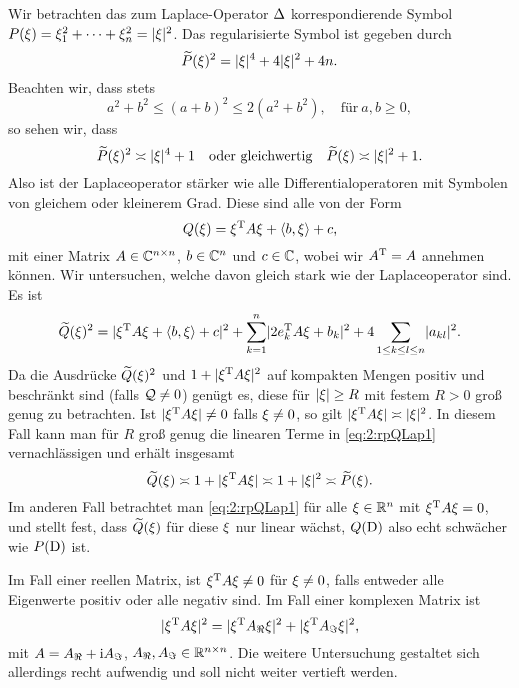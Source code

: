 \begin{exa}\label{exa:2:lap}
Wir betrachten das zum Laplace-Operator $\Delta$
korrespondierende Symbol $P(\xi)=\xi_1^2+\dots+\xi_n^2=\lvert\xi\rvert^2$.
Das regularisierte Symbol ist gegeben durch
\begin{equation}
\widetilde{P}(\xi)^2=\lvert\xi\rvert^4+4\lvert\xi\rvert^2+4n.
\end{equation}
Beachten wir, dass stets
\begin{equation}\label{eq:2:sqrest}
a^2+b^2\leq(a+b)^2\leq2(a^2+b^2),\quad\text{für}~a,b\geq0,
\end{equation}
so sehen wir, dass
\begin{equation}
\widetilde{P}(\xi)^2\asymp\lvert\xi\rvert^4+1\quad\text{oder gleichwertig}\quad\widetilde{P}(\xi)\asymp\lvert\xi\rvert^2+1.
\end{equation}
Also ist der Laplaceoperator stärker wie alle Differentialoperatoren
mit Symbolen von gleichem oder kleinerem Grad.
Diese sind alle von der Form
\begin{equation}
Q(\xi)=\xi^{\mathrm{T}} A\xi+\langle b,\xi\rangle+c,
\end{equation}
mit einer Matrix $A\in\mathbb C^{n\times n}$, $b\in\mathbb C^n$ und $c\in\mathbb C$,
wobei wir $A^{\mathrm{T}}=A$ annehmen können.
Wir untersuchen, welche davon gleich stark wie der Laplaceoperator sind.
Es ist
\begin{equation}\label{eq:2:rpQLap1}
\widetilde{Q}(\xi)^2=\lvert\xi^{\mathrm{T}} A\xi+\langle b,\xi\rangle+c\rvert^2+\sum_{k=1}^n\lvert2e^{\mathrm{T}}_kA\xi+b_k\rvert^2
+4\sum_{1\leq k\leq l\leq n}\lvert a_{kl}\rvert^2.
\end{equation}
Da die Ausdrücke $\widetilde{Q}(\xi)^2$ und $1+\lvert\xi^{\mathrm{T}} A\xi\rvert^2$
auf kompakten Mengen positiv und beschränkt sind (falls $\mathcal Q\neq0$) genügt es,
diese für $\lvert\xi\rvert\geq R$ mit festem $R>0$ groß genug zu betrachten.
Ist $\lvert\xi^{\mathrm{T}} A\xi\rvert\neq0$ falls $\xi\neq0$,
so gilt $\lvert\xi^{\mathrm{T}} A\xi\rvert\asymp\lvert\xi\rvert^2$.
In diesem Fall kann man für $R$ groß genug die
linearen Terme in \eqref{eq:2:rpQLap1} vernachlässigen
und erhält insgesamt
\begin{equation}
\widetilde{Q}(\xi)\asymp1+\lvert\xi^{\mathrm{T}} A\xi\rvert\asymp1+\lvert\xi\rvert^2\asymp\widetilde{P}(\xi).
\end{equation}
Im anderen Fall betrachtet man \eqref{eq:2:rpQLap1}
für alle $\xi\in\mathbb R^n$ mit $\xi^{\mathrm{T}} A\xi=0$,
und stellt fest, dass $\widetilde{Q}(\xi)$ für diese $\xi$ nur linear wächst,
$Q(\mathrm D)$ also echt schwächer wie $P(\mathrm D)$ ist.

Im Fall einer reellen Matrix, ist $\xi^{\mathrm{T}} A\xi\neq0$ für $\xi\neq0$,
falls entweder alle Eigenwerte positiv oder alle negativ sind.
Im Fall einer komplexen Matrix ist
\begin{equation}
\lvert\xi^{\mathrm{T}} A\xi\rvert^2=\lvert\xi^{\mathrm{T}} A_\Re\xi\rvert^2+\lvert\xi^{\mathrm{T}} A_\Im\xi\rvert^2,
\end{equation}
mit $A=A_\Re+\mathrm i A_\Im$, $A_\Re,A_\Im\in\mathbb R^{n\times n}$.
Die weitere Untersuchung gestaltet sich allerdings recht aufwendig
und soll nicht weiter vertieft werden.
\end{exa}

